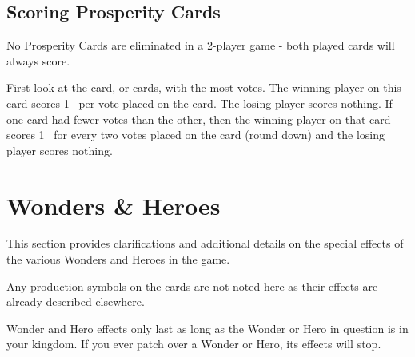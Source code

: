 \documentclass[10pt,twocolumn]{article}
\begin{document}
\begin{appendices}
\subsection{Scoring Prosperity Cards}
No Prosperity Cards are eliminated in a 2-player game - both played cards will always score.

First look at the card, or cards, with the most votes. The winning player on this card scores 1 \vp\ per vote placed on the card. The losing player scores nothing. If one card had fewer votes than the other, then the winning player on that card scores 1 \vp\ for every two votes placed on the card (round down) and the losing player scores nothing.
\section{Wonders \& Heroes}
This section provides clarifications and additional details on the special effects of the various Wonders and Heroes in the game.

Any production symbols on the cards are not noted here as their effects are already described elsewhere.

Wonder and Hero effects only last as long as the Wonder or Hero in question is in your kingdom. If you ever patch over a Wonder or Hero, its effects will stop.

\end{appendices}
\end{document}
